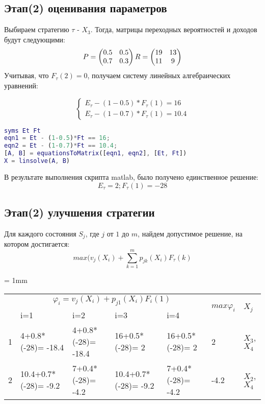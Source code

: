 \subsection{Этап(2) оценивания параметров}
Выбираем стратегию $\tau$ - $X_3$.  Тогда, матрицы переходных вероятностей и доходов будут следующими:
\begin{equation*}
P=\begin{pmatrix}
0.5 & 0.5\\
0.7 & 0.3
\end{pmatrix}\\
R=\begin{pmatrix}
19 & 13\\
11 & 9
\end{pmatrix}
\end{equation*}
Учитывая, что  $F_{\tau}(2)=0$, получаем систему линейных алгебраических уравнений:

\begin{equation*}
\begin{cases}
E_{\tau}-(1-0.5)*F_{\tau}(1)=16\\
E_{\tau}-(1-0.7)*F_{\tau}(1)=10.4
\end{cases}
\end{equation*}
\begin{lstlisting}[language={matlab}, caption={Скрпит для решения системы уравнений},basicstyle=\ttfamily]
syms Et Ft
eqn1 = Et - (1-0.5)*Ft == 16;
eqn2 = Et - (1-0.7)*Ft == 10.4;
[A, B] = equationsToMatrix([eqn1, eqn2], [Et, Ft])
X = linsolve(A, B)
\end{lstlisting}
В результате выполнения скрипта matlab, было получено единственное решение:
\begin{equation*}
E_{\tau}=2; F_{\tau}(1)=-28
\end{equation*}

\subsection{Этап(2) улучшения стратегии}
Для каждого состояния $S_j$, где $j$ от $1$ до $m$, найдем допустимое решение, на котором достигается:
\begin{equation*}
max(v_j(X_i)+\sum_{k=1}^mp_{jk}(X_i)F_{\tau}(k)
\end{equation*}


\tabulinesep = 1mm
\begin{longtabu} to \textwidth {|X[1, c , m ] |X[3, c , m ] | X[3,c , m ]|X[3,c , m ]|X[3,c , m ]| X[2,c , m ]|X[1,c , m ]|}\firsthline\hline

 &  &  & \\ 
&i=1&i=2&i=3&i=4&&\\ &4+0.8*(-28)= -18.4&4+0.8*(-28)= -18.4&16+0.5*(-28)= 2&16+0.5*(-28)= 2&2&$X_3$, $X_4$\\ &10.4+0.7*(-28)= -9.2&7+0.4*(-28)= -4.2&10.4+0.7*(-28)= -9.2&7+0.4*(-28)= -4.2&-4.2&$X_2$, $X_4$\\ \hline
\end{longtabu}

